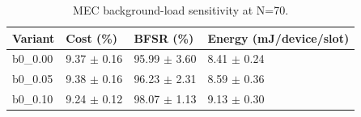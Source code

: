\begin{table}[t]
\centering
\caption{MEC background-load sensitivity at N=70.}
\label{tab:background_load}
\begin{tabular}{llll}
\toprule
Variant & Cost (\%) & BFSR (\%) & Energy (mJ/device/slot) \\
\midrule
b0_0.00 & 9.37 $\pm$ 0.16 & 95.99 $\pm$ 3.60 & 8.41 $\pm$ 0.24 \\
b0_0.05 & 9.38 $\pm$ 0.16 & 96.23 $\pm$ 2.31 & 8.59 $\pm$ 0.36 \\
b0_0.10 & 9.24 $\pm$ 0.12 & 98.07 $\pm$ 1.13 & 9.13 $\pm$ 0.30 \\
\bottomrule
\end{tabular}
\end{table}
